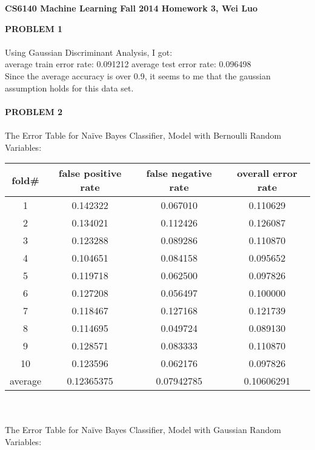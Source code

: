 \documentclass[11pt,a4paper,fleqn]{article}
\begin{document}
\begin{center}
\textbf{CS6140 Machine Learning Fall 2014 Homework 3, Wei Luo }\\
\end{center}
\textbf{PROBLEM 1}\\
\\
Using Gaussian Discriminant Analysis, I got:  \\
average train error rate: 0.091212
average test error rate: 0.096498 \\
Since the average accuracy is over 0.9, it seems to me that the gaussian assumption holds for this data set.\\
\\
\textbf{PROBLEM 2}\\
\\
The Error Table for Na\"{i}ve Bayes Classifier, Model with Bernoulli Random Variables:\\
\begin{tabular}{|c|c|c|c|}
\hline
fold\#&false positive rate&false negative rate&overall error rate\\
\hline
1&0.142322&0.067010&0.110629\\
\hline
2&0.134021&0.112426&0.126087\\
\hline
3&0.123288&0.089286&0.110870\\
\hline
4&0.104651&0.084158&0.095652\\
\hline
5&0.119718&0.062500&0.097826\\
\hline
6&0.127208&0.056497&0.100000\\
\hline
7&0.118467&0.127168&0.121739\\
\hline
8&0.114695&0.049724&0.089130\\
\hline
9&0.128571&0.083333&0.110870\\
\hline
10&0.123596&0.062176&0.097826\\
\hline
average&0.12365375&0.07942785&0.10606291\\
\hline
\end{tabular}\\
\\
The Error Table for Na\"{i}ve Bayes Classifier, Model with Gaussian Random Variables:\\
\end{document}
